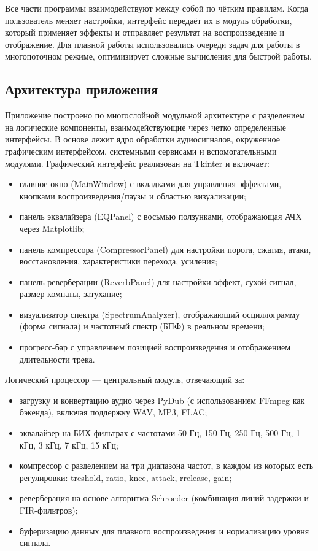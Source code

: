 Все части программы взаимодействуют между собой по чётким правилам. Когда пользователь меняет настройки, интерфейс передаёт их в модуль обработки, который применяет эффекты и отправляет результат на воспроизведение и отображение. Для плавной работы использовались очереди задач для работы в многопоточном режиме, оптимизирует сложные вычисления для быстрой работы.

\subsection{Архитектура приложения}

Приложение построено по многослойной модульной архитектуре с разделением на логические компоненты, взаимодействующие через четко определенные интерфейсы. В основе лежит ядро обработки аудиосигналов, окруженное графическим интерфейсом, системными сервисами и вспомогательными модулями.
Графический интерфейс реализован на Tkinter и включает:
\begin{itemize}
	\item главное окно (MainWindow) с вкладками для управления эффектами, кнопками воспроизведения/паузы и областью визуализации;
	\item панель эквалайзера (EQPanel) с восьмью ползунками, отображающая АЧХ через Matplotlib;
	\item панель компрессора (CompressorPanel) для настройки порога, сжатия, атаки, восстановления, характеристики перехода, усиления;
	\item панель реверберации (ReverbPanel) для настройки эффект, сухой сигнал, размер комнаты, затухание;
	\item визуализатор спектра (SpectrumAnalyzer), отображающий осциллограмму (форма сигнала) и частотный спектр (БПФ) в реальном времени;
	\item прогресс-бар с управлением позицией воспроизведения и отображением длительности трека.	
\end{itemize}

Логический процессор — центральный модуль, отвечающий за:
\begin{itemize}
	\item загрузку и конвертацию аудио через PyDub (с использованием FFmpeg как бэкенда), включая поддержку WAV, MP3, FLAC;
	\item эквалайзер на БИХ-фильтрах с частотами 50 Гц, 150 Гц, 250 Гц, 500 Гц, 1 кГц, 3 кГц, 7 кГц, 15 кГц;
	\item компрессор с разделением на три диапазона частот, в каждом из которых есть регулировки: treshold, ratio, knee, attack, rrelease, gain;
	\item реверберация на основе алгоритма Schroeder (комбинация линий задержки и FIR-фильтров);
	\item буферизацию данных для плавного воспроизведения и нормализацию уровня сигнала.
\end{itemize}

